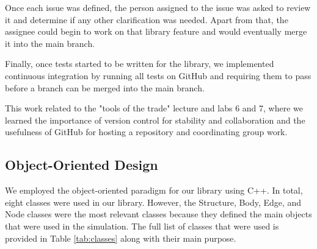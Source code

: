 Once each issue was defined, the person assigned to the issue was asked to review it and determine if any other clarification was needed. Apart from that, the assignee could begin to work on that library feature and would eventually merge it into the main branch. 

Finally, once tests started to be written for the library, we implemented continuous integration by running all tests on GitHub and requiring them to pass before a branch can be merged into the main branch.

This work related to the "tools of the trade" lecture and labs 6 and 7, where we learned the importance of version control for stability and collaboration and the usefulness of GitHub for hosting a repository and coordinating group work.
\subsection{Object-Oriented Design}
We employed the object-oriented paradigm for our library using C++. In total, eight classes were used in our library. However, the Structure, Body, Edge, and Node classes were the most relevant classes because they defined the main objects that were used in the simulation. The full list of classes that were used is provided in Table \ref{tab:classes} along with their main purpose.
\begin{table}[H]
\centering
\caption{Okin Library's Classes}
\label{tab:classes}
\def\arraystretch{1.05}
\end{table}

